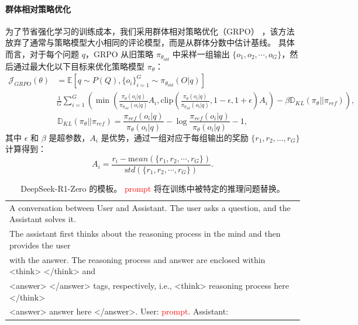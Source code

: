 \documentclass[11pt, a4paper, logo, copyright, nonumbering]{deepseek}
\newcommand{\dsro}{DeepSeek-R1-Zero}
\begin{document}
\paragraph{群体相对策略优化} 为了节省强化学习的训练成本，我们采用群体相对策略优化（GRPO） \citep{deepseekmath}，该方法放弃了通常与策略模型大小相同的评论模型，而是从群体分数中估计基线。
具体而言，对于每个问题 $q$，GRPO 从旧策略 $\pi_{\theta_{old}}$ 中采样一组输出 $\{o_1, o_2, \cdots, o_G\}$，然后通过最大化以下目标来优化策略模型 $\pi_{\theta}$：
\begin{equation}
\begin{split}
    \mathcal{J}_{GRPO}(\theta) &= \mathbb{E}{[q \sim P(Q), \{o_i\}_{i=1}^G \sim \pi_{\theta_{old}}(O|q)]}  \\
    & \frac{1}{G}\sum_{i=1}^G \left( \min \left( \frac{\pi_\theta(o_i |q)}{\pi_{\theta_{old}}(o_i |q)} A_i, \text{clip} \left( \frac{\pi_\theta(o_i |q)}{\pi_{\theta_{old}}(o_i |q)}, 1 - \epsilon, 1 + \epsilon \right)  A_i \right) - \beta \mathbb{D}_{KL}\left(\pi_{\theta} || \pi_{ref}\right)\right) ,
\end{split}
\label{eq:GRPO-obj}
\end{equation}
\begin{equation}
    \mathbb{D}_{KL}\left(\pi_{\theta} || \pi_{ref}\right) = \frac{\pi_{ref}(o_i|q)}{\pi_{\theta}(o_i|q)}- \log\frac{\pi_{ref}(o_i|q)}{\pi_{\theta}(o_i|q)} - 1,
\end{equation}
其中 $\epsilon$ 和 $\beta$ 是超参数，$A_i$ 是优势，通过一组对应于每组输出的奖励 $\{r_1, r_2, \ldots, r_G\}$ 计算得到：
\begin{equation}
    A_i = \frac{r_i - {\mathrm mean(\{r_1, r_2, \cdots, r_G\})}}{{\mathrm std(\{r_1, r_2, \cdots, r_G\})}}.
\end{equation}

\begin{table}[t]
    \centering
    \small
    \begin{tabular}{l}
    \toprule
    A conversation between User and Assistant. The user asks a question, and the Assistant solves it. \\
     The assistant first thinks about the reasoning process in the mind and then provides the user \\ with the answer.
     The reasoning process and answer are enclosed within <think> </think> and \\<answer> </answer> tags, respectively, i.e., <think> reasoning process here </think> \\ <answer> answer here </answer>.
     User: \textcolor{red}{prompt}. Assistant: \\
     \bottomrule
    \end{tabular}
    \caption{ \dsro{} 的模板。 \textcolor{red}{prompt} 将在训练中被特定的推理问题替换。}
    \label{tab:r0_template}
\end{table}
\end{document}
